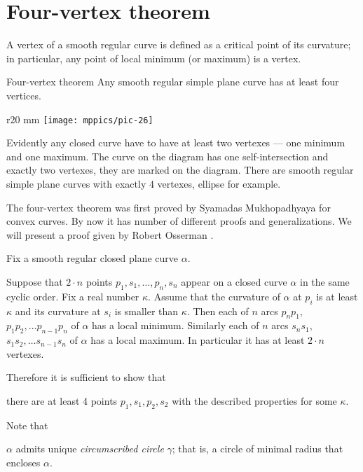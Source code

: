 \chapter{Four-vertex theorem}

A vertex of a smooth regular curve is defined as a critical point of its curvature;
in particular, any point of local minimum (or maximum) is a vertex.

\begin{thm}{Four-vertex theorem}
Any smooth regular simple plane curve has at least four
vertices.
\end{thm}

\begin{wrapfigure}{r}{20 mm}
\vskip-4mm
\centering
\texttt{[image: mppics/pic-26]}
\vskip0mm
\end{wrapfigure}

Evidently any closed curve have to have at least two vertexes --- one minimum and one maximum.
The curve on the diagram has one self-intersection and exactly two vertexes, they are marked on the diagram.
There are smooth regular simple plane curves with exactly 4 vertexes, 
ellipse for example.

The four-vertex theorem was first proved by Syamadas Mukhopadhyaya \cite{mukhopadhyaya} for convex curves.
By now it has number of different proofs and generalizations.
We will present a proof given by Robert Osserman \cite{osserman}.

Fix a smooth regular closed plane curve $\alpha$.

Suppose that $2\cdot n$ points $p_1,s_1,\dots,p_n,s_n$ appear on a closed curve $\alpha$ in the same cyclic order.
Fix a real number $\kappa$.
Assume that the curvature of $\alpha$ at $p_i$ is at least $\kappa$ and its curvature at $s_i$ is smaller than $\kappa$.
Then each of $n$ arcs $p_{n}p_1$, $p_{1}p_2, \dots p_{n-1}p_n$ of
$\alpha$ has a local minimum.
Similarly each of $n$ arcs $s_{n}s_1$, $s_{1}s_2, \dots s_{n-1}s_n$ of
$\alpha$ has a local maximum.
In particular it has at least $2\cdot n$ vertexes.

Therefore it is sufficient to show that

\begin{clm}{}\label{clm-key}
there are at least 4 points $p_1,s_1,p_2,s_2$ with the described properties for some $\kappa$.
\end{clm}


Note that
\begin{clm}{}\label{clm:circumscribed circle}
$\alpha$
admits unique \emph{circumscribed circle} $\gamma$; that is, a circle of minimal radius that encloses $\alpha$.
\end{clm}

